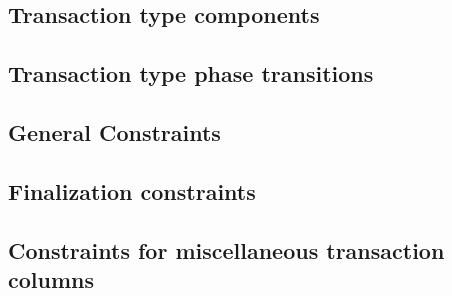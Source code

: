 \subsection{Transaction type \rlp{} components}                   \label{rlp txn v2: generalities: transaction type rlp components}    
\subsection{Transaction type phase transitions}                   \label{rlp txn v2: generalities: admissible rlp component flags}     
\subsection{General Constraints}                                  \label{rlp txn v2: generalities: indices and limb constructed}       
\subsection{Finalization constraints}                             \label{rlp txn v2: generalities: heartbeat}                          
\subsection{Constraints for miscellaneous transaction columns}    \label{rlp txn v2: generalities: miscellaneous txn columns}          
